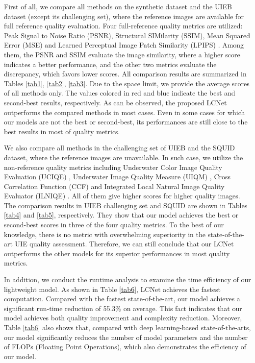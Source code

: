 \documentclass[journal]{IEEEtran}
\begin{document}
First of all, we compare all methods on the synthetic dataset and the UIEB dataset (except its challenging set), where the reference images are available for full reference quality evaluation. Four full-reference quality metrics are utilized: Peak Signal to Noise Ratio (PSNR), Structural SIMilarity (SSIM), Mean Squared Error (MSE) and Learned Perceptual Image Patch Similarity (LPIPS) \cite{zhang2018perceptual}. Among them, the PSNR and SSIM evaluate the image similarity, where a higher score indicates a better performance, and the other two metrics evaluate the discrepancy, which favors lower scores. All comparison results are summarized in Tables \ref{tab1}, \ref{tab2}, \ref{tab3}. Due to the space limit, we provide the average scores of all methods only. The values colored in red and blue indicate the best and second-best results, respectively. As can be observed, the proposed LCNet outperforms the compared methods in most cases. Even in some cases for which our models are not the best or second-best, its performances are still close to the best results in most of quality metrics.

We also compare all methods in the challenging set of UIEB and the SQUID dataset, where the reference images are unavailable. In such case, we utilize the non-reference quality metrics including Underwater Color Image Quality Evaluation (UCIQE) \cite{yang2015underwater}, Underwater Image Quality Measure (UIQM) \cite{panetta2015human},  Cross Correlation Function (CCF) \cite{CCF} and Integrated Local Natural Image Quality Evaluator (ILNIQE) \cite{LNIQE}. All of them give higher scores for higher quality images. The comparison results in UIEB challenging set and SQUID are shown in Tables \ref{tab4} and \ref{tab5}, respectively. They show that our model achieves the best or second-best scores in three of the four quality metrics. To the best of our knowledge, there is no metric with overwhelming superiority in the state-of-the-art UIE quality assessment. Therefore, we can still conclude that our LCNet outperforms the other models for its superior performances in most quality metrics.

In addition, we conduct the runtime analysis to examine the time efficiency of our lightweight model. As shown in Table \ref{tab6}, LCNet achieves the fastest computation. Compared with the fastest state-of-the-art, our model achieves a significant run-time reduction of 55.3\(\%\) on average. This fact indicates that our model achieves both quality improvement and complexity reduction. Moreover, Table \ref{tab6} also shows that, compared with deep learning-based state-of-the-arts, our model significantly reduces the number of model parameters and the number of FLOPs (Floating Point Operations), which also demonstrates the efficiency of our model.
\end{document}
